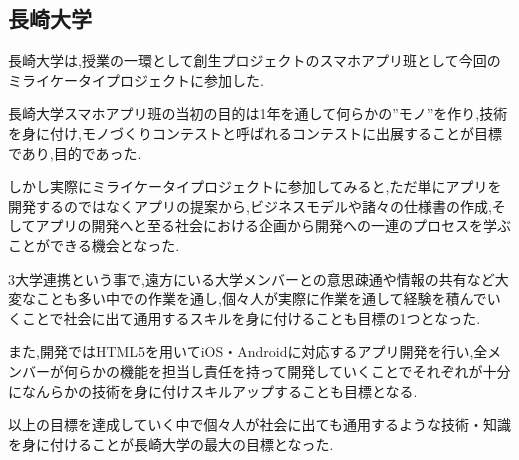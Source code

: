 \subsection{長崎大学}
\par
長崎大学は,授業の一環として創生プロジェクトのスマホアプリ班として今回のミライケータイプロジェクトに参加した.
\par
長崎大学スマホアプリ班の当初の目的は1年を通して何らかの”モノ”を作り,技術を身に付け,モノづくりコンテストと呼ばれるコンテストに出展することが目標であり,目的であった.
\par
しかし実際にミライケータイプロジェクトに参加してみると,ただ単にアプリを開発するのではなくアプリの提案から,ビジネスモデルや諸々の仕様書の作成,そしてアプリの開発へと至る社会における企画から開発への一連のプロセスを学ぶことができる機会となった.
\par
3大学連携という事で,遠方にいる大学メンバーとの意思疎通や情報の共有など大変なことも多い中での作業を通し,個々人が実際に作業を通して経験を積んでいくことで社会に出て通用するスキルを身に付けることも目標の1つとなった.
\par
また,開発ではHTML5を用いてiOS・Androidに対応するアプリ開発を行い,全メンバーが何らかの機能を担当し責任を持って開発していくことでそれぞれが十分になんらかの技術を身に付けスキルアップすることも目標となる.
\par
以上の目標を達成していく中で個々人が社会に出ても通用するような技術・知識を身に付けることが長崎大学の最大の目標となった.
\par
{}
